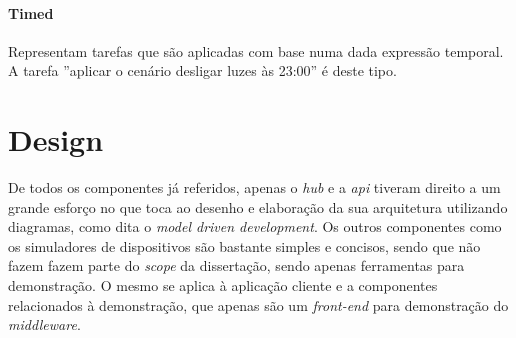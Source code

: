 \paragraph*{Timed}
Representam tarefas que são aplicadas com base numa dada expressão temporal. A tarefa ''aplicar o cenário desligar luzes às 23:00'' é deste tipo.

\section{Design}

De todos os componentes já referidos, apenas o \textit{hub} e a \textit{api} tiveram direito a um grande esforço no que toca ao desenho e elaboração da sua arquitetura utilizando diagramas, como dita o \textit{model driven development}. Os outros componentes como os simuladores de dispositivos são bastante simples e concisos, sendo que não fazem fazem parte do \textit{scope} da dissertação, sendo apenas ferramentas para demonstração. O mesmo se aplica à aplicação cliente e a componentes relacionados à demonstração, que apenas são um \textit{front-end} para demonstração do \textit{middleware}.


